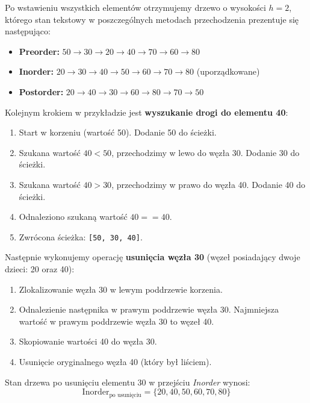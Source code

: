 \hspace{0.60cm}
Po wstawieniu wszystkich elementów otrzymujemy drzewo o wysokości $h = 2$, którego stan tekstowy w poszczególnych metodach przechodzenia prezentuje się następująco:
\begin{itemize}
    \item \textbf{Preorder:} $50 \rightarrow 30 \rightarrow 20 \rightarrow 40 \rightarrow 70 \rightarrow 60 \rightarrow 80$
    \item \textbf{Inorder:} $20 \rightarrow 30 \rightarrow 40 \rightarrow 50 \rightarrow 60 \rightarrow 70 \rightarrow 80$ (uporządkowane)
    \item \textbf{Postorder:} $20 \rightarrow 40 \rightarrow 30 \rightarrow 60 \rightarrow 80 \rightarrow 70 \rightarrow 50$
\end{itemize}

\hspace{0.60cm}
Kolejnym krokiem w przykładzie jest \textbf{wyszukanie drogi do elementu 40}:
\begin{enumerate}
    \item Start w korzeniu (wartość 50). Dodanie 50 do ścieżki.
    \item Szukana wartość $40 < 50$, przechodzimy w lewo do węzła 30. Dodanie 30 do ścieżki.
    \item Szukana wartość $40 > 30$, przechodzimy w prawo do węzła 40. Dodanie 40 do ścieżki.
    \item Odnaleziono szukaną wartość $40 == 40$.
    \item Zwrócona ścieżka: \texttt{[50, 30, 40]}.
\end{enumerate}

\hspace{0.60cm}
Następnie wykonujemy operację \textbf{usunięcia węzła 30} (węzeł posiadający dwoje dzieci: 20 oraz 40):
\begin{enumerate}
    \item Zlokalizowanie węzła 30 w lewym poddrzewie korzenia.
    \item Odnalezienie następnika w prawym poddrzewie węzła 30. Najmniejsza wartość w prawym poddrzewie węzła 30 to węzeł 40.
    \item Skopiowanie wartości 40 do węzła 30.
    \item Usunięcie oryginalnego węzła 40 (który był liściem).
\end{enumerate}

\hspace{0.60cm}
Stan drzewa po usunięciu elementu 30 w przejściu \textit{Inorder} wynosi:
\begin{equation}
    \text{Inorder}_{\text{po usunięciu}} = \{20, 40, 50, 60, 70, 80\}
\end{equation}

